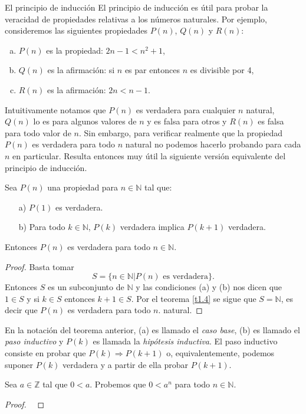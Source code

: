 \begin{section}{El principio de inducción}
El principio de inducción es útil para probar la veracidad de propiedades relativas a los
números naturales. Por ejemplo, consideremos las siguientes propiedades $P(n)$, $Q(n)$ y $R(n)$:
\begin{enumerate}[a)]
\item $P(n)$ es la propiedad: $2n -1 < n^2 + 1$,
\item $Q(n)$ es la afirmación: si $n$ es par entonces $n$ es divisible por 4,
\item $R(n)$ es la afirmación: $2n < n- 1$.
\end{enumerate}
Intuitivamente notamos que $P(n)$ es verdadera para cualquier $n$ natural, $Q(n)$ lo es para algunos
valores de $n$ y es falsa para otros y $R(n)$ es falsa para todo valor de $n$. Sin
embargo, para verificar realmente que la propiedad $P(n)$ es verdadera para todo $n$ natural no
podemos hacerlo probando para cada $n$ en particular. Resulta entonces muy útil la siguiente
versión equivalente del principio de inducción.
\begin{teorema}\label{induccion2} Sea $P(n)$ una propiedad para $n \in \mathbb N$ tal que:
\begin{enumerate}
\item[a)] $P(1)$ es verdadera.
\item[b)] Para todo $k \in \mathbb N$, $P(k)$ verdadera implica $P(k + 1)$ verdadera.
\end{enumerate}
Entonces $P(n)$ es verdadera para todo $n \in \mathbb N$.
\end{teorema}
\begin{proof} Basta tomar
$$S = \{n \in \mathbb N| P(n) \text{ es verdadera} \}.$$
Entonces $S$ es un subconjunto de $\mathbb N$ y las condiciones (a) y (b) nos dicen que $1 \in S$ y  si $ k \in S$ entonces $k+1\in S$. Por el teorema \ref{t1.4} se sigue que $S= \mathbb N$, es decir que $P(n)$ es verdadera para todo $n$.
natural.
\end{proof}


En la notación del teorema anterior, (a) es llamado  el {\em caso base}, (b) es llamado el  {\em paso inductivo} y $P(k)$ es llamada la {\em hipótesis inductiva}. El paso inductivo  consiste en probar que $P(k) \Rightarrow P(k + 1)$ o, equivalentemente, podemos suponer $P(k)$ verdadera y a partir de ella probar $P(k + 1)$. 


\begin{ejemplo}\label{ejemplo141} Sea $a\in \mathbb Z$ tal que $0<a$. Probemos que $0<a^n$ para todo $n \in \mathbb N$.
\end{ejemplo}
\begin{proof}
\


\end{proof}
\end{section}
